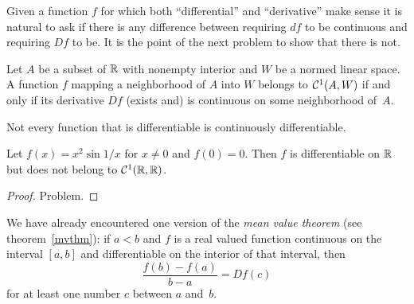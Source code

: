Given a function $f$ for which both ``differential'' and ``derivative'' make sense it is
natural to ask if there is any difference between requiring $df$ to be continuous and
requiring $Df$ to be.  It is the point of the next problem to show that there is not.

\begin{prob} Let $A$ be a subset of $\mathbb{R}$ with nonempty interior and $W$ be a normed linear space.
A function $f$ mapping a neighborhood of $A$ into $W$ belongs to $\mathcal{C}^1(A,W)$ if and only
if its derivative $Df$ (exists and) is continuous on some neighborhood of~$A$.
\end{prob}

Not every function that is differentiable is continuously differentiable.

\begin{exam} Let $f(x) = x^2 \sin 1/x$ for $x \ne 0$ and $f(0) = 0$.  Then $f$ is differentiable
on $\mathbb{R}$ but does not belong to $\mathcal{C}^1(\mathbb{R},\mathbb{R})$.
\end{exam}

\begin{proof} Problem.   \ns  \end{proof}

We have already encountered one version of the \emph{mean value theorem} (see
theorem~\ref{mvthm}): if $a < b$ and $f$ is a real valued function continuous on the interval
$[a,b]$ and differentiable on the interior of that interval, then
 \begin{equation}\label{eqn_mvt1}
     \frac{f(b) - f(a)}{b - a} = Df(c)
 \end{equation}
for at least one number $c$ between $a$ and~$b$.

